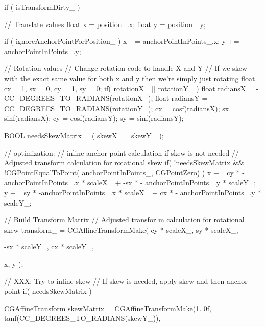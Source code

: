 \begin{DoxyCode}
{
        if ( isTransformDirty_ ) {

                // Translate values
                float x = position_.x;
                float y = position_.y;

                if ( ignoreAnchorPointForPosition_ ) {
                        x += anchorPointInPoints_.x;
                        y += anchorPointInPoints_.y;
                }
    
                // Rotation values
                // Change rotation code to handle X and Y
                // If we skew with the exact same value for both x and y then
       we're simply just rotating
                float cx = 1, sx = 0, cy = 1, sy = 0;
                if( rotationX_ || rotationY_ ) {
                        float radiansX = -CC_DEGREES_TO_RADIANS(rotationX_);
                        float radiansY = -CC_DEGREES_TO_RADIANS(rotationY_);
                        cx = cosf(radiansX);
                        sx = sinf(radiansX);
                        cy = cosf(radiansY);
                        sy = sinf(radiansY);
                }

                BOOL needsSkewMatrix = ( skewX_ || skewY_ );

                // optimization:
                // inline anchor point calculation if skew is not needed
                // Adjusted transform calculation for rotational skew
                if( !needsSkewMatrix && !CGPointEqualToPoint(
      anchorPointInPoints_, CGPointZero) ) {
                        x += cy * -anchorPointInPoints_.x * scaleX_ + -sx * -
      anchorPointInPoints_.y * scaleY_;
                        y += sy * -anchorPointInPoints_.x * scaleX_ +  cx * -
      anchorPointInPoints_.y * scaleY_;
                }


                // Build Transform Matrix
                // Adjusted transfor m calculation for rotational skew
                transform_ = CGAffineTransformMake( cy * scaleX_, sy * scaleX_,
                                                                                
         -sx * scaleY_, cx * scaleY_,
                                                                                
         x, y );

                // XXX: Try to inline skew
                // If skew is needed, apply skew and then anchor point
                if( needsSkewMatrix ) {
                        CGAffineTransform skewMatrix = CGAffineTransformMake(1.
      0f, tanf(CC_DEGREES_TO_RADIANS(skewY_)),
                                                                                                                                
}}}
\end{DoxyCode}
